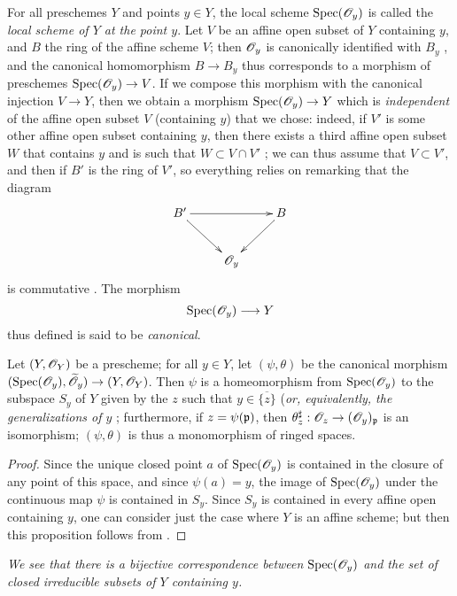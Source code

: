 For all preschemes $Y$ and points $y\in Y$, the local scheme ${\mathop{\mathrm{Spec}}\nolimits}(\mathscr{O}_y)$
is called the \emph{local scheme of $Y$ at the point $y$}.
Let $V$ be an affine open subset of $Y$ containing $y$, and $B$ the ring of the affine scheme $V$;
then $\mathscr{O}_y$ is canonically identified with $B_y$ , and the canonical homomorphism $B\to B_y$ thus corresponds  to a morphism of preschemes $\Spec(\OO_y)\to V$.
If we compose this morphism with the canonical injection $V\to Y$, then we obtain a morphism $\Spec(\OO_y)\to Y$ which is \emph{independent} of the affine open subset $V$ (containing $y$) that we chose: indeed, if $V'$ is some other affine open subset containing $y$, then there exists a third affine open subset $W$ that contains $y$ and is such that $W\subset V\cap V'$ ;
we can thus assume that $V\subset V'$, and then if $B'$ is the ring of $V'$, so everything relies on remarking that the diagram
\[
  \xymatrix{
    B'\ar[rr]\ar[dr] & &
    B\ar[dl]\\
    & \OO_y
  }
\]
is commutative .
The morphism
\[
  \Spec(\OO_y)\to Y
\]
thus defined is said to be {\it canonical}.

\begin{prop}[2.4.2]
\label{1.2.4.2}
Let $(Y,\mathscr{O}_Y)$ be a prescheme;
for all $y\in Y$, let $(\psi,\theta)$ be the canonical morphism $(\Spec(\OO_y),\widetilde{\OO}_y)\to(Y,\OO_Y)$.
Then $\psi$ is a homeomorphism from ${\mathop{\mathrm{Spec}}\nolimits}(\mathscr{O}_y)$ to the subspace $S_y$ of $Y$ given by the $z$ such that $y\in\overline{\{z\}}$ (\emph{or, equivalently, the generalizations of $y$ };
furthermore, if $z=\psi(\mathfrak{p})$, then $\theta_z^\sharp:\OO_z\to(\OO_y)_\fk{p}$ is an isomorphism;
$(\psi,\theta)$ is thus a monomorphism of ringed spaces.
\end{prop}

\begin{proof}
\label{proof-1.2.4.2}
Since the unique closed point $a$ of ${\mathop{\mathrm{Spec}}\nolimits}(\mathscr{O}_y)$ is contained in the closure of any point of this space, and since $\psi(a)=y$, the image of ${\mathop{\mathrm{Spec}}\nolimits}(\mathscr{O}_y)$ under the continuous map $\psi$ is contained in $S_y$.
Since $S_y$ is contained in every affine open containing $y$, one can consider just the case where $Y$ is an affine scheme;
but then this proposition follows from .
\end{proof}

\emph{We see  that there is a bijective correspondence between ${\mathop{\mathrm{Spec}}\nolimits}(\mathscr{O}_y)$ and the set of closed irreducible subsets of $Y$ containing $y$.}

